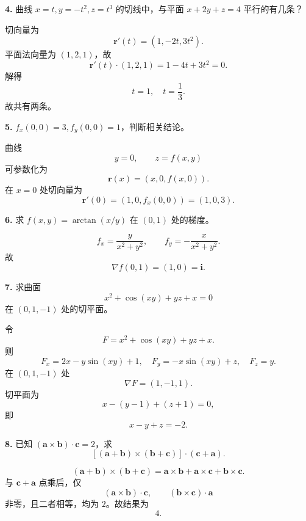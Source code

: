 \begin{problemblock}
\textbf{4.} 曲线 \(x=t,y=-t^2,z=t^3\) 的切线中，与平面 \(x+2y+z=4\) 平行的有几条？
\end{problemblock}
\begin{solutionblock}
切向量为
\[
\boldsymbol r'(t)=(1,-2t,3t^2).
\]
平面法向量为 \((1,2,1)\)，故
\[
\boldsymbol r'(t)\cdot(1,2,1)=1-4t+3t^2=0.
\]
解得
\[
t=1,\quad t=\frac13.
\]
故共有两条。
\end{solutionblock}

\begin{problemblock}
\textbf{5.} \(f_x(0,0)=3,f_y(0,0)=1\)，判断相关结论。
\end{problemblock}
\begin{solutionblock}
曲线
\[
y=0,\qquad z=f(x,y)
\]
可参数化为
\[
\boldsymbol r(x)=(x,0,f(x,0)).
\]
在 \(x=0\) 处切向量为
\[
\boldsymbol r'(0)=(1,0,f_x(0,0))=(1,0,3).
\]
\end{solutionblock}

\begin{problemblock}
\textbf{6.} 求 \(f(x,y)=\arctan(x/y)\) 在 \((0,1)\) 处的梯度。
\end{problemblock}
\begin{solutionblock}
\[
f_x=\frac{y}{x^2+y^2},\qquad f_y=-\frac{x}{x^2+y^2}.
\]
故
\[
\nabla f(0,1)=(1,0)=\boldsymbol i.
\]
\end{solutionblock}

\begin{problemblock}
\textbf{7.} 求曲面
\[
x^2+\cos(xy)+yz+x=0
\]
在 \((0,1,-1)\) 处的切平面。
\end{problemblock}
\begin{solutionblock}
令
\[
F=x^2+\cos(xy)+yz+x.
\]
则
\[
F_x=2x-y\sin(xy)+1,\quad F_y=-x\sin(xy)+z,\quad F_z=y.
\]
在 \((0,1,-1)\) 处
\[
\nabla F=(1,-1,1).
\]
切平面为
\[
x-(y-1)+(z+1)=0,
\]
即
\[
\boxed{x-y+z=-2}.
\]
\end{solutionblock}

\begin{problemblock}
\textbf{8.} 已知 \((\boldsymbol a\times\boldsymbol b)\cdot\boldsymbol c=2\)，求
\[
[(\boldsymbol a+\boldsymbol b)\times(\boldsymbol b+\boldsymbol c)]\cdot(\boldsymbol c+\boldsymbol a).
\]
\end{problemblock}
\begin{solutionblock}
\[
(\boldsymbol a+\boldsymbol b)\times(\boldsymbol b+\boldsymbol c)
=\boldsymbol a\times\boldsymbol b+\boldsymbol a\times\boldsymbol c+\boldsymbol b\times\boldsymbol c.
\]
与 \(\boldsymbol c+\boldsymbol a\) 点乘后，仅
\[
(\boldsymbol a\times\boldsymbol b)\cdot\boldsymbol c,\qquad
(\boldsymbol b\times\boldsymbol c)\cdot\boldsymbol a
\]
非零，且二者相等，均为 \(2\)。故结果为
\[
\boxed{4}.
\]
\end{solutionblock}

